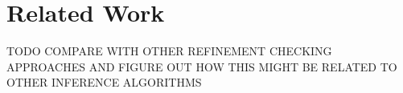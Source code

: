 \section{Related Work}
\label{sec:related}

TODO COMPARE WITH OTHER REFINEMENT CHECKING APPROACHES AND FIGURE OUT HOW THIS
MIGHT BE RELATED TO OTHER INFERENCE ALGORITHMS
